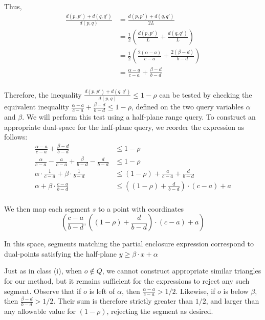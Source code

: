 \noindent Thus,
\[
\begin{split} 
\frac{d(p, p') + d(q, q')}{d(p, q)}
%
&= \frac{d(p, p') + d(q, q')}{2L} \\
%
&= \frac{1}{2} \left ( \frac{d(p, p')}{L} + \frac{d(q, q')}{L} \right ) \\
%
&= \frac{1}{2} \left ( \frac{2(\alpha - a)}{c - a} + \frac{2(\beta - d)}{b - d} \right ) \\
%
&= \frac{\alpha - a}{c - a} + \frac{\beta - d}{b - d} \\
%
\end{split}
\]

\indent Therefore, the inequality $\frac{d(p, p') + d(q, q')}{d(p, q)} \leq 1 - \rho$ can be tested by checking the equivalent inequality $\frac{\alpha - a}{c - a} + \frac{\beta - d}{b - d} \leq 1 - \rho$, defined on the two query variables $\alpha$ and $\beta$. 
We will perform this test using a half-plane range query. 
To construct an appropriate dual-space for the half-plane query, we reorder the expression as follows:
\[
\begin{split}
\frac{\alpha - a}{c - a} + \frac{\beta - d}{b - d} &\leq 1 - \rho \\
%
\frac{\alpha}{c-a} - \frac{a}{c-a} + \frac{\beta}{b-d} - \frac{d}{b-d} &\leq 1 - \rho \\
%
\alpha \cdot \frac{1}{c-a} + \beta \cdot \frac{1}{b-d} &\leq (1 - \rho) + \frac{a}{c-a} + \frac{d}{b-d} \\
%
\alpha + \beta \cdot \frac{c-a}{b-d} &\leq \left ( (1 - \rho) + \frac{d}{b-d} \right ) \cdot (c-a) + a \\
%
\end{split}
\]

\noindent We then map each segment $s$ to a point with coordinates
\[
\left (\frac{c-a}{b-d}, \left ( (1 - \rho) + \frac{d}{b-d} \right ) \cdot (c-a) + a \right )
\]

\noindent In this space, segments matching the partial enclosure expression correspond to dual-points satisfying the half-plane $y \geq \beta \cdot x + \alpha$

Just as in class (i), when $o \not \in Q$, we cannot construct appropriate similar triangles for our method, but it remains sufficient for the expressions to reject any such segment. Observe that if $o$ is left of $\alpha$, then $\frac{\alpha - a}{c - a} > 1/2$. Likewise, if $o$ is below $\beta$, then $\frac{\beta - d}{b - d} > 1/2$. Their sum is therefore strictly greater than $1/2$, and larger than any allowable value for $(1 - \rho)$, rejecting the segment as desired.


